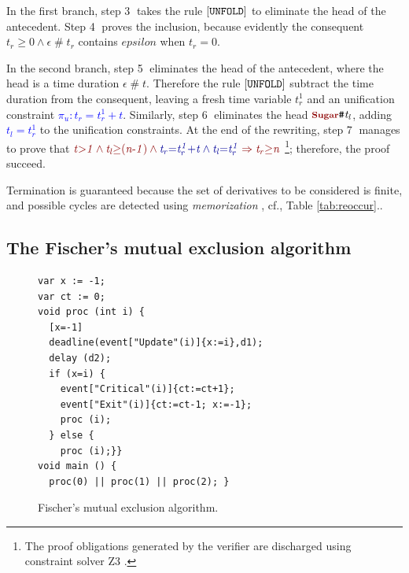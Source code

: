 \documentclass[acmsmall,10pt,review]{acmart}
\newcommand{\anyevent}[1]{{\textcolor{darkred}
{{\textbf{\footnotesize #1}}}}}
\newcommand{\code}[1]{{\tt{\ensuremath{\m{#1}}}}}
\newcommand{\codeme}[1]{{\tt{\ensuremath{#1}}}}
\newcommand{\m}{\mathit}
\newcommand{\mysharp}{{\mathrel{\texttt{\#}}}}
\newcommand\tabref[1]{Table \textcolor{black}{\ref{#1}}.}
\begin{document}
{In the first branch, step \textcircled{3} takes the rule 
$\codeme{[UNFOLD]}$ to eliminate the head of the antecedent. 
Step \textcircled{4} proves the inclusion, because 
evidently the consequent \code{t_r {\geq} 0 \wedge \epsilon \mysharp t_r} 
contains \code{epsilon} when \code{t_r{=}0}. 

In the second branch, step \textcircled{5} eliminates the 
head of the antecedent, where the head is a time duration \code{\epsilon\mysharp t}. 
Therefore the rule $\codeme{[UNFOLD]}$ subtract the time duration 
from the consequent, leaving a fresh time variable \code{t_r^1} and 
an unification constraint \textcolor{blue}{\code{\pi_u : t_r{=}t_r^1 {+}t}}. 
Similarly, step \textcircled{6} eliminates the head 
\code{\anyevent{Sugar}\mysharp t_l}, adding \textcolor{blue}{\code{t_l{=}t_r^1}} 
to the unification constraints. 
At the end of the rewriting, step \textcircled{7} manages to prove that 
\code{\textcolor {darkred}{  t{>}1 \wedge t_l{\geq}(n\text{-}1) 
\wedge  \textcolor{blue}{t_r{=}t_r^1 {+}t \wedge  t_l{=}t_r^1}  \Rightarrow t_r{\geq}n
}  } \footnote{The proof obligations generated by the verifier are discharged using constraint solver Z3 \cite{DBLP:conf/tacas/MouraB08}.}; therefore, the proof succeed.

Termination is guaranteed because the set of derivatives to be considered is finite, and possible cycles are detected using 
\emph{memorization} \cite{DBLP:conf/tableaux/Brotherston05}, cf., \tabref{tab:reoccur}. 


\subsection{The Fischer's mutual exclusion algorithm}




\begin{figure}
  \vspace{-1mm}
\begin{lstlisting}
var x := -1; 
var ct := 0;
void proc (int i) {
  [x=-1] 
  deadline(event["Update"(i)]{x:=i},d1);
  delay (d2);
  if (x=i) {
    event["Critical"(i)]{ct:=ct+1};
    event["Exit"(i)]{ct:=ct-1; x:=-1};
    proc (i);
  } else {
    proc (i);}}
void main () { 
  proc(0) || proc(1) || proc(2); }
\end{lstlisting}  
  \vspace{-1mm}
  \caption{Fischer's mutual exclusion algorithm.}\label{fig:overview_ficher}
     \vspace{-1mm}
\end{figure}

}
\end{document}
